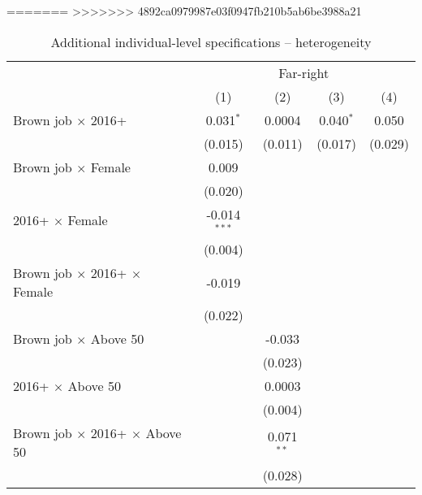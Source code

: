 =======
>>>>>>> 4892ca0979987e03f0947fb210b5ab6be3988a21

\begin{table}[htbp]
   \caption{Additional individual-level specifications – heterogeneity}
   \centering
   \begin{tabular}{lcccc}
      \tabularnewline \midrule \midrule
       & \multicolumn{4}{c}{Far-right}\\
                                                      & (1)            & (2)          & (3)            & (4)\\  
      Brown job $\times$ 2016+                        & 0.031$^{*}$    & 0.0004       & 0.040$^{*}$    & 0.050\\   
                                                      & (0.015)        & (0.011)      & (0.017)        & (0.029)\\   
      Brown job $\times$ Female                       & 0.009          &              &                &   \\   
                                                      & (0.020)        &              &                &   \\   
      2016+ $\times$ Female                           & -0.014$^{***}$ &              &                &   \\   
                                                      & (0.004)        &              &                &   \\   
      Brown job $\times$ 2016+ $\times$ Female        & -0.019         &              &                &   \\   
                                                      & (0.022)        &              &                &   \\   
      Brown job $\times$ Above 50                     &                & -0.033       &                &   \\   
                                                      &                & (0.023)      &                &   \\   
      2016+ $\times$ Above 50                         &                & 0.0003       &                &   \\   
                                                      &                & (0.004)      &                &   \\   
      Brown job $\times$ 2016+ $\times$ Above 50      &                & 0.071$^{**}$ &                &   \\   
                                                      &                & (0.028)      &                &   \\   

\end{tabular}
\end{table}
